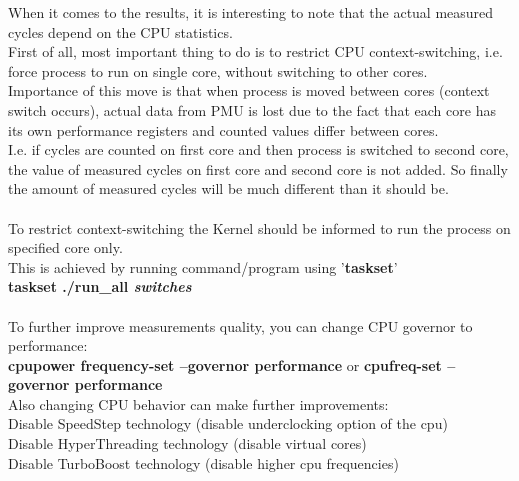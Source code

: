 \documentclass[11pt,onecolumn]{article}
\begin{document}
When it comes to the results, it is interesting to note that the actual measured cycles depend on the CPU statistics.\\
First of all, most important thing to do is to restrict CPU context-switching, i.e. force process to run on single core, without switching to other cores.\\
Importance of this move is that when process is moved between cores (context switch occurs), actual data from PMU is lost due to the fact that each core has its own performance registers and counted values differ between cores.\\
I.e. if cycles are counted on first core  and then process is switched to second core, the value of measured cycles on first core and second core is not added. So finally the amount of measured cycles will be much different than it should be.\\\\
To restrict context-switching the Kernel should be informed to run the process on specified core only.\\
This is achieved by running command/program using '\textbf{taskset}'\\
\textbf{taskset ./run\_all \textit{switches}}\\\\
To further improve measurements quality, you can change CPU governor to performance:\\
\textbf{cpupower frequency-set --governor performance} or \textbf{cpufreq-set --governor performance}\\
Also changing CPU behavior can make further improvements:\\
Disable SpeedStep technology (disable underclocking option of the cpu)\\
Disable HyperThreading technology (disable virtual cores)\\
Disable TurboBoost technology (disable higher cpu frequencies)\\
\end{document}
